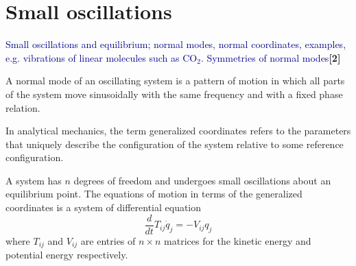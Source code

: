 \documentclass[a4paper]{article}
\begin{document}
\newpage
\section{Small oscillations}
{\small\textcolor{darkblue}{Small oscillations and equilibrium; normal modes, normal coordinates, examples, e.g. vibrations of linear molecules such as CO$_2$. Symmetries of normal modes}\hfill\textbf{[2]}}
\begin{defi}
A normal mode of an oscillating system is a pattern of motion in which all parts of the system move sinusoidally with the same frequency and with a fixed phase relation.
\end{defi}
\begin{defi}
In analytical mechanics, the term generalized coordinates refers to the parameters that uniquely describe the configuration of the system relative to some reference configuration.
\end{defi}
\begin{prop}
A system has $n$ degrees of freedom and undergoes small oscillations about an equilibrium point. The equations of motion in terms of the generalized coordinates is a system of differential equation
$$\frac{d}{dt}T_{ij}\dot{q}_j=-V_{ij}q_j$$
where $T_{ij}$ and $V_{ij}$ are entries of $n\times n$ matrices for the kinetic energy and potential energy respectively.
\end{prop}
\end{document}
